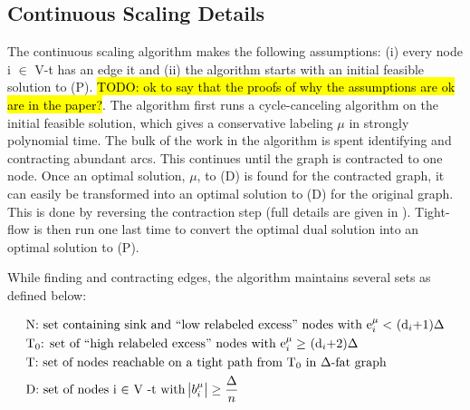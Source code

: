 \documentclass[11pt]{article}
\theoremstyle{definition}
\theoremstyle{definition}
\newcommand{\todo}[1]{\hl{TODO: #1}}
\begin{document}
	\subsection{Continuous Scaling Details}
	The continuous scaling algorithm makes the following assumptions: (i) every node i $\in$ V-t has an edge it and (ii) the algorithm starts with an initial feasible solution to (P). \todo{ok to say that the proofs of why the assumptions are ok are in the paper?}. The algorithm first runs a cycle-canceling algorithm on the initial feasible solution, which gives a conservative labeling $\mu$ in strongly polynomial time. The bulk of the work in the algorithm is spent identifying and contracting abundant arcs. This continues until the graph is contracted to one node. Once an optimal solution, $\mu$, to (D) is found for the contracted graph, it can easily be transformed into an optimal solution to (D) for the original graph. This is done by reversing the contraction step (full details are given in \cite{article}). Tight-flow is then run one last time to convert the optimal dual solution into an optimal solution to (P).
	
	While finding and contracting edges, the algorithm maintains several sets as defined below:
	
	\begin{align*}
	&\text{N: set containing sink and ``low relabeled excess'' nodes with e$_i^\mu <$ (d$_i$+1)$\Delta$} \\
	&\text{T$_0$: set of ``high relabeled excess'' nodes with e$_i^\mu \geq$ (d$_i$+2)$\Delta$} \\
	&\text{T: set of nodes reachable on a tight path from T$_0$ in $\Delta$-fat graph} \\ 
	&\text{D: set of nodes i $\in$ V -t with $\abs{b_i^\mu} \geq \frac{\Delta}{n}$}
	\end{align*}
	
\end{document}
